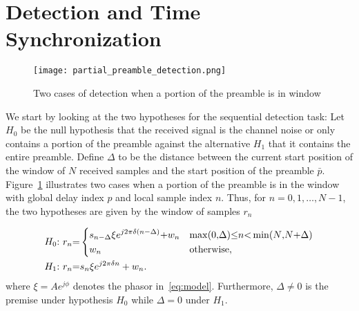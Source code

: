 \section{Detection and Time Synchronization}
\label{sec:detection}

\begin{figure}[t]
  \centerline{\texttt{[image: partial\_preamble\_detection.png]}}
  \caption{Two cases of detection when a portion of the preamble is in window}
  \label{fig:partial_preamble_detection}
  \end{figure}

We start by looking at the two hypotheses for the sequential detection task:
Let $H_0$ be the null hypothesis that the received signal is the channel noise or only contains a portion of the preamble against the alternative $H_1$ that it contains the entire preamble. 
Define $\Delta$ to be the distance between the current start position of the window
of $N$ received samples and the start position of the preamble $\bar{p}$.
Figure~\ref{fig:partial_preamble_detection} illustrates two cases when a portion of the 
preamble is in the window with global delay index $p$ and local sample index $n$.
Thus, for $n=0,1,\ldots,N-1$, the two hypotheses are given by the window of samples $r_n$

\begin{equation}
  \label{eq:two hypotheses}
  \begin{aligned}
  &H_0{:}~r_n{=}
  \begin{dcases}
      s_{n-\Delta}\xi e^{j2\pi\delta (n-\Delta)}{+}w_n & \max(0{,}\Delta){\leq} n{<} \min(N{,}N{+}\Delta) \\
      w_n & \text{otherwise},
  \end{dcases} \\
  &H_1{:}~r_n{=}s_n\xi e^{j2\pi\delta n}+w_n.
  \end{aligned}
\end{equation}
where $\xi=Ae^{j\phi}$ denotes the phasor in~\eqref{eq:model}.
Furthermore, $\Delta \neq 0$ is the premise under hypothesis $H_0$
while $\Delta=0$ under $H_1$.  

